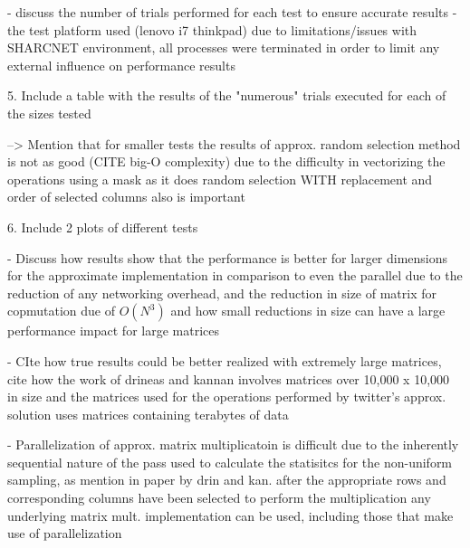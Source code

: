 \documentclass[oneside]{article}
\begin{document}
- discuss the number of trials performed for each test to ensure accurate results
- the test platform used (lenovo i7 thinkpad) due to limitations/issues with SHARCNET environment, all processes were terminated in order to limit any external influence on performance results



5. Include a table with the results of the "numerous" trials executed for each of the sizes tested

    --> Mention that for smaller tests the results of approx. random selection method is not as good (CITE big-O complexity) due to the difficulty in vectorizing the operations using a mask as it does random selection WITH replacement and order of selected columns also is important


6. Include 2 plots of different tests

- Discuss how results show that the performance is better for larger dimensions for the approximate implementation in comparison to even the parallel due to the reduction of any networking overhead, and
the reduction in size of matrix for copmutation due of $O(N^{3})$ and how small reductions in size can have
a large performance impact for large matrices

- CIte how true results could be better realized with extremely large matrices, cite how the work of drineas and kannan involves matrices over 10,000 x 10,000 in size and the matrices used for the operations performed by twitter's approx. solution uses matrices containing terabytes of data

- Parallelization of approx. matrix multiplicatoin is difficult due to the inherently sequential nature of the pass used to calculate the statisitcs for the non-uniform sampling, as mention in paper by drin and kan. after the appropriate rows and corresponding columns have been selected to perform the multiplication any underlying
matrix mult. implementation can be used, including those that make use of parallelization
\end{document}
